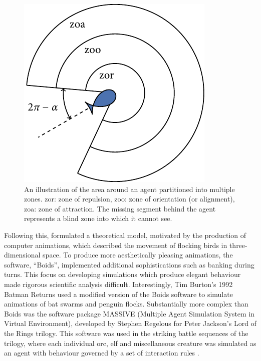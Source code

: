 \begin{figure}[t]
	\includegraphics{zonal_tikz.pdf}
	\caption{An illustration of the area around an agent partitioned into multiple zones. zor: zone of 
repulsion, zoo: zone of orientation (or alignment), zoa: zone of attraction. The missing segment 
behind the agent represents a blind zone into which it cannot see.}
	\label{fig:zone_illustration}
\end{figure}

Following this, \textcite{reynolds87} formulated a theoretical model, motivated by the production of 
computer animations, which described the movement of flocking birds in three-dimensional space. To 
produce more aesthetically pleasing animations, the software, ``Boids'', implemented additional 
sophistications such as banking during turns. This focus on developing simulations which produce 
elegant behaviour made rigorous scientific analysis difficult. Interestingly, Tim Burton's 1992 
Batman Returns used a modified version of the Boids software to simulate animations of bat swarms and 
penguin flocks. Substantially more complex than Boids was the software package MASSIVE (Multiple 
Agent Simulation System in Virtual Environment), developed by Stephen Regelous for Peter Jackson's 
Lord of the Rings trilogy. This software was used in the striking battle sequences of the trilogy, 
where each individual orc, elf and miscellaneous creature was simulated as an agent with behaviour 
governed by a set of interaction rules \parencite{robbins17}.

